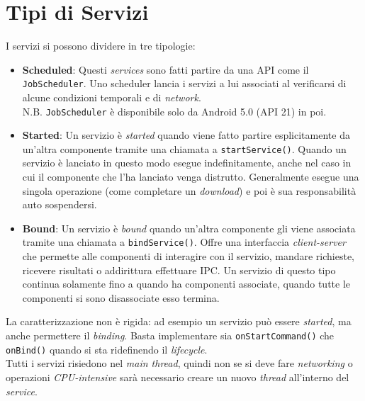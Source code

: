 \section{Tipi di Servizi}
I servizi si possono dividere in tre tipologie:
\begin{itemize}
	\item \textbf{Scheduled}: Questi \textit{services} sono fatti partire da una API come il \texttt{JobScheduler}. Uno scheduler lancia i servizi a lui associati al verificarsi di alcune condizioni temporali e di \textit{network}.\\
	N.B. \texttt{JobScheduler} è disponibile solo da Android 5.0 (API 21) in poi.
	\item \textbf{Started}: Un servizio è \textit{started} quando viene fatto partire esplicitamente da un'altra componente tramite una chiamata a \texttt{startService()}. Quando un servizio è lanciato in questo modo esegue indefinitamente, anche nel caso in cui il componente che l'ha lanciato venga distrutto. Generalmente esegue una singola operazione (come completare un \textit{download}) e poi è sua responsabilità auto sospendersi. 
	\item \textbf{Bound}: Un servizio è \textit{bound} quando un'altra componente gli viene associata tramite una chiamata a \texttt{bindService()}. Offre una interfaccia \textit{client-server} che permette alle componenti di interagire con il servizio, mandare richieste, ricevere risultati o addirittura effettuare IPC. Un servizio di questo tipo continua solamente fino a quando ha componenti associate, quando tutte le componenti si sono disassociate esso termina.
\end{itemize}


La caratterizzazione non è rigida: ad esempio un servizio può essere \textit{started}, ma anche permettere il \textit{binding}. Basta implementare sia \texttt{onStartCommand()} che \texttt{onBind()} quando si sta ridefinendo il \textit{lifecycle}.\\
Tutti i servizi risiedono nel \textit{main thread}, quindi non se si deve fare \textit{networking} o operazioni \textit{CPU-intensive} sarà necessario creare un nuovo \textit{thread} all'interno del \textit{service}.


